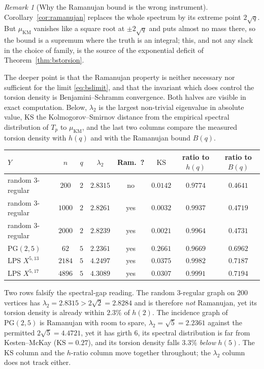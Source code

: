 \documentclass[11pt]{amsart}
\numberwithin{equation}{section}
\theoremstyle{definition}
\theoremstyle{remark}
\newtheorem{remark}[theorem]{Remark}
\begin{document}
\begin{remark}[Why the Ramanujan bound is the wrong instrument]\label{rem:bsnumerics}
Corollary~\ref{cor:ramanujan} replaces the whole spectrum by its extreme point
$2\sqrt q$. But $\mu_{\mathrm{KM}}$ vanishes like a square root at $\pm2\sqrt q$ and puts
almost no mass there, so the bound is a supremum where the truth is an integral; this,
and not any slack in the choice of family, is the source of the exponential deficit of
Theorem~\ref{thm:bstorsion}.

The deeper point is that the Ramanujan property is neither necessary nor sufficient for
the limit \eqref{eq:bslimit}, and that the invariant which does control the torsion
density is Benjamini--Schramm convergence. Both halves are visible in exact computation.
Below, $\lambda_2$ is the largest non-trivial eigenvalue in absolute value,
$\mathrm{KS}$ the Kolmogorov--Smirnov distance from the empirical spectral distribution
of $T_p$ to $\mu_{\mathrm{KM}}$, and the last two columns compare the measured torsion
density with $h(q)$ and with the Ramanujan bound $B(q)$.
\begin{center}\small
\renewcommand{\arraystretch}{1.15}\setlength{\tabcolsep}{5pt}
\begin{tabular}{lccccccc}
\toprule
$Y$ & $n$ & $q$ & $\lambda_2$ & Ram.\ ? & $\mathrm{KS}$
& ratio to $h(q)$ & ratio to $B(q)$\\
\midrule
random $3$-regular   & $200$  & $2$ & $2.8315$ & no  & $0.0142$ & $0.9774$ & $0.4641$\\
random $3$-regular   & $1000$ & $2$ & $2.8261$ & yes & $0.0032$ & $0.9937$ & $0.4719$\\
random $3$-regular   & $2000$ & $2$ & $2.8239$ & yes & $0.0021$ & $0.9964$ & $0.4731$\\
$\mathrm{PG}(2,5)$   & $62$   & $5$ & $2.2361$ & yes & $0.2661$ & $0.9669$ & $0.6962$\\
LPS $X^{5,13}$       & $2184$ & $5$ & $4.2497$ & yes & $0.0375$ & $0.9982$ & $0.7187$\\
LPS $X^{5,17}$       & $4896$ & $5$ & $4.3089$ & yes & $0.0307$ & $0.9991$ & $0.7194$\\
\bottomrule
\end{tabular}
\end{center}
Two rows falsify the spectral-gap reading. The random $3$-regular graph on $200$
vertices has $\lambda_2=2.8315>2\sqrt2=2.8284$ and is therefore \emph{not} Ramanujan,
yet its torsion density is already within $2.3\%$ of $h(2)$. The incidence graph of
$\mathrm{PG}(2,5)$ is Ramanujan with room to spare, $\lambda_2=\sqrt5=2.2361$ against
the permitted $2\sqrt5=4.4721$, yet it has girth $6$, its spectral distribution is far
from Kesten--McKay ($\mathrm{KS}=0.27$), and its torsion density falls $3.3\%$
\emph{below} $h(5)$. The $\mathrm{KS}$ column and the $h$-ratio column move together
throughout; the $\lambda_2$ column does not track either.


\end{remark}
\end{document}
